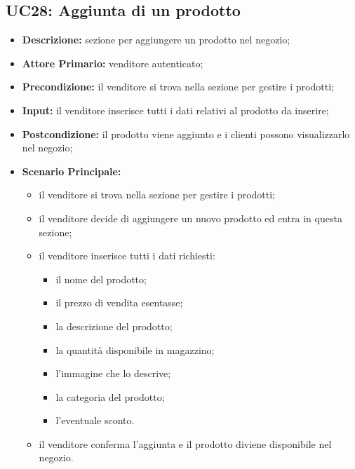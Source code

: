 \subsection{UC28: Aggiunta di un prodotto}
\label{sec:UC28}
\begin{itemize}
    \item \textbf{Descrizione:} sezione per aggiungere un prodotto nel negozio;
    \item \textbf{Attore Primario:} venditore autenticato;
    \item \textbf{Precondizione:} il venditore si trova nella sezione per gestire i prodotti;
    \item \textbf{Input:} il venditore inserisce tutti i dati relativi al prodotto da inserire;
    \item \textbf{Postcondizione:} il prodotto viene aggiunto e i clienti possono visualizzarlo nel negozio;
    \item \textbf{Scenario Principale:}
          \begin{itemize}
              \item il venditore si trova nella sezione per gestire i prodotti;
              \item il venditore decide di aggiungere un nuovo prodotto ed entra in questa sezione;
              \item il venditore inserisce tutti i dati richiesti:
                    \begin{itemize}
                        \item il nome del prodotto;
                        \item il prezzo di vendita esentasse;
                        \item la descrizione del prodotto;
                        \item la quantità disponibile in magazzino;
                        \item l'immagine che lo descrive;
                        \item la categoria del prodotto;
                        \item l'eventuale sconto.
                    \end{itemize}
              \item il venditore conferma l'aggiunta e il prodotto diviene disponibile nel negozio.
          \end{itemize}
\end{itemize}